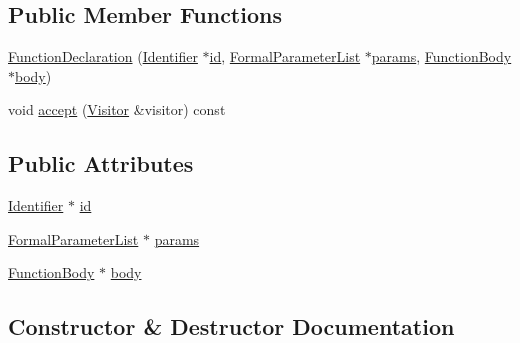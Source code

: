 \subsection*{Public Member Functions}
\begin{DoxyCompactItemize}
\item 
\hyperlink{struct_function_declaration_a2760e02567ddf39823e4a0b9a69898fa}{Function\+Declaration} (\hyperlink{struct_identifier}{Identifier} $\ast$\hyperlink{struct_function_declaration_a58de81497de15b01a5f92632c3e6f354}{id}, \hyperlink{struct_formal_parameter_list}{Formal\+Parameter\+List} $\ast$\hyperlink{struct_function_declaration_ab22f1972d3575c2b95778545d871658b}{params}, \hyperlink{struct_function_body}{Function\+Body} $\ast$\hyperlink{struct_function_declaration_ae35697bf8c8a45e490fa352d77a0c19b}{body})
\item 
void \hyperlink{struct_function_declaration_a879cc374076bebe3609f66306d6a638d}{accept} (\hyperlink{struct_visitor}{Visitor} \&visitor) const
\end{DoxyCompactItemize}
\subsection*{Public Attributes}
\begin{DoxyCompactItemize}
\item 
\hyperlink{struct_identifier}{Identifier} $\ast$ \hyperlink{struct_function_declaration_a58de81497de15b01a5f92632c3e6f354}{id}
\item 
\hyperlink{struct_formal_parameter_list}{Formal\+Parameter\+List} $\ast$ \hyperlink{struct_function_declaration_ab22f1972d3575c2b95778545d871658b}{params}
\item 
\hyperlink{struct_function_body}{Function\+Body} $\ast$ \hyperlink{struct_function_declaration_ae35697bf8c8a45e490fa352d77a0c19b}{body}
\end{DoxyCompactItemize}


\subsection{Constructor \& Destructor Documentation}
\mbox{\label{struct_function_declaration_a2760e02567ddf39823e4a0b9a69898fa}} 
